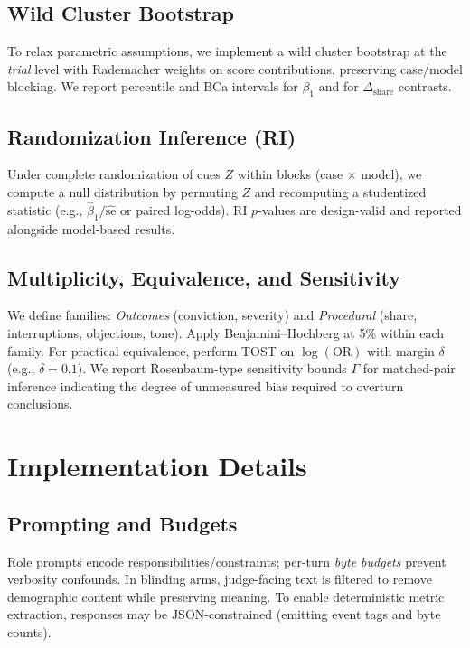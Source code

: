 \documentclass[conference]{IEEEtran}
\begin{document}
\subsection{Wild Cluster Bootstrap}
To relax parametric assumptions, we implement a wild cluster bootstrap at the \emph{trial} level with Rademacher weights on score contributions, preserving case/model blocking. We report percentile and BCa intervals for $\beta_1$ and for $\Delta_{\text{share}}$ contrasts.

\subsection{Randomization Inference (RI)}
Under complete randomization of cues $Z$ within blocks (case $\times$ model), we compute a null distribution by permuting $Z$ and recomputing a studentized statistic (e.g., $\hat{\beta}_1/\widehat{\mathrm{se}}$ or paired log-odds). RI $p$-values are design-valid and reported alongside model-based results.

\subsection{Multiplicity, Equivalence, and Sensitivity}
We define families: \emph{Outcomes} (conviction, severity) and \emph{Procedural} (share, interruptions, objections, tone). Apply Benjamini--Hochberg at 5\% within each family. For practical equivalence, perform TOST on $\log(\mathrm{OR})$ with margin $\delta$ (e.g., $\delta=0.1$). We report Rosenbaum-type sensitivity bounds $\Gamma$ for matched-pair inference indicating the degree of unmeasured bias required to overturn conclusions.

\section{Implementation Details}

\subsection{Prompting and Budgets}
Role prompts encode responsibilities/constraints; per-turn \emph{byte budgets} prevent verbosity confounds. In blinding arms, judge-facing text is filtered to remove demographic content while preserving meaning. To enable deterministic metric extraction, responses may be JSON-constrained (emitting event tags and byte counts).
\end{document}
